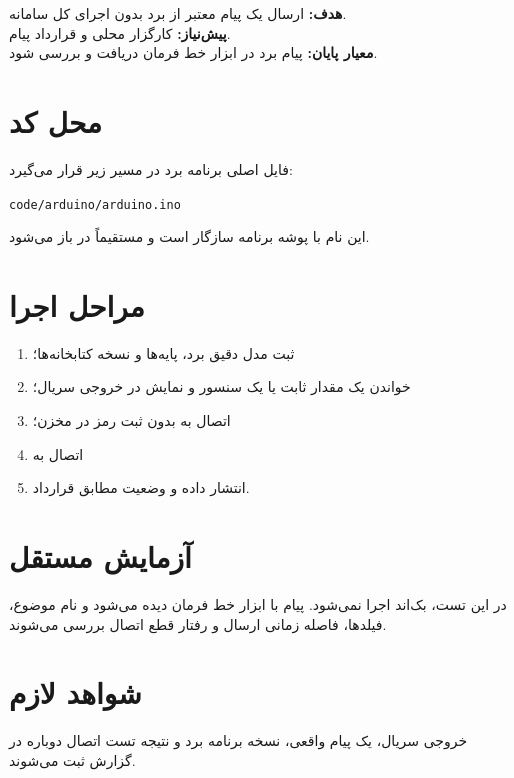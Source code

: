 \begin{phasebox}
\textbf{هدف:} ارسال یک پیام معتبر از برد بدون اجرای کل سامانه.\\
\textbf{پیش‌نیاز:} کارگزار محلی و قرارداد پیام.\\
\textbf{معیار پایان:} پیام برد در ابزار خط فرمان دریافت و بررسی شود.
\end{phasebox}

\section{محل کد}
فایل اصلی برنامه برد در مسیر زیر قرار می‌گیرد:

\begin{LTR}
\texttt{code/arduino/arduino.ino}
\end{LTR}

این نام با پوشه برنامه سازگار است و مستقیماً در
باز می‌شود.

\section{مراحل اجرا}
\begin{enumerate}
    \item ثبت مدل دقیق برد، پایه‌ها و نسخه کتابخانه‌ها؛
    \item خواندن یک مقدار ثابت یا یک سنسور و نمایش در خروجی سریال؛
    \item اتصال به
    بدون ثبت رمز در مخزن؛
    \item اتصال به
    \item انتشار داده و وضعیت مطابق قرارداد.
\end{enumerate}

\section{آزمایش مستقل}
در این تست، بک‌اند اجرا نمی‌شود. پیام با ابزار خط فرمان دیده می‌شود و نام موضوع، فیلدها، فاصله زمانی ارسال و رفتار قطع اتصال بررسی می‌شوند.

\section{شواهد لازم}
خروجی سریال، یک پیام واقعی، نسخه برنامه برد و نتیجه تست اتصال دوباره در گزارش ثبت می‌شوند.
